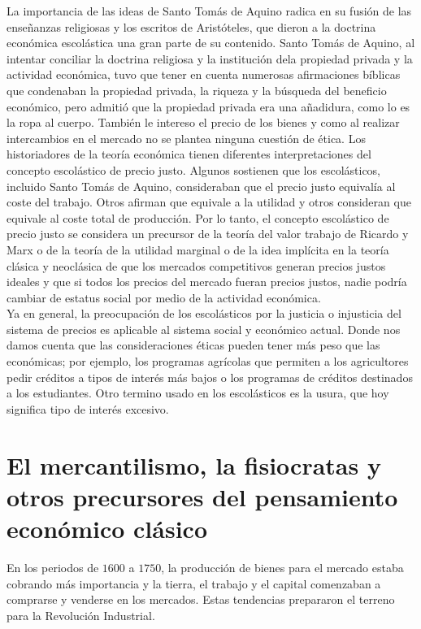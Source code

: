 \documentclass[10pt]{book}
\begin{document}
La importancia de las ideas de Santo Tomás de Aquino radica en su fusión de las enseñanzas religiosas y los escritos de Aristóteles, que dieron a la doctrina económica escolástica una gran parte de su contenido. Santo Tomás de Aquino, al intentar conciliar la doctrina religiosa y la institución dela propiedad privada y la actividad económica, tuvo que tener en cuenta numerosas afirmaciones bíblicas que condenaban la propiedad privada, la riqueza y la búsqueda del beneficio económico, pero admitió que la propiedad privada era una añadidura, como lo es la ropa al cuerpo. También le intereso el precio de los bienes y  como al realizar intercambios en el mercado no se plantea ninguna cuestión de ética. Los historiadores de la teoría económica tienen diferentes interpretaciones del concepto escolástico de precio justo. Algunos sostienen que los escolásticos, incluido Santo Tomás de Aquino, consideraban que el precio justo equivalía al coste del trabajo. Otros afirman que equivale a la utilidad y otros consideran que equivale al coste total de producción. Por lo tanto, el concepto escolástico de precio justo se considera un precursor de la teoría del valor trabajo de Ricardo y Marx o de la teoría de la utilidad marginal o de la idea implícita en la teoría clásica y neoclásica de que los mercados competitivos generan precios justos ideales y que si todos los precios del mercado fueran precios justos, nadie podría cambiar de estatus social por medio de la actividad económica.\\

Ya en general, la preocupación de los escolásticos por la justicia o injusticia del sistema de precios es aplicable al sistema social y económico actual. Donde nos damos cuenta que las consideraciones éticas pueden tener más peso que las económicas; por ejemplo, los programas agrícolas que permiten a los agricultores pedir créditos a tipos de interés más bajos o los programas de créditos destinados a los estudiantes. Otro termino usado en los escolásticos es la usura, que hoy significa tipo de interés excesivo.

\chapter{El mercantilismo, la fisiocratas y otros precursores del pensamiento económico clásico}
En los periodos de $1600$ a $1750$, la producción de bienes para el mercado estaba cobrando más importancia y la tierra, el trabajo y el capital comenzaban a comprarse y venderse en los mercados. Estas tendencias prepararon el terreno para la Revolución Industrial.
\end{document}
